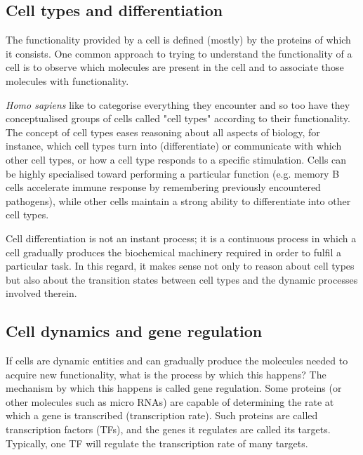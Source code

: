 \subsection{Cell types and differentiation}
The functionality provided by a cell is defined (mostly) by the proteins of which it consists. One common approach to trying to understand the functionality of a cell is to observe which molecules are present in the cell and to associate those molecules with functionality. 

\textit{Homo sapiens} like to categorise everything they encounter and so too have they conceptualised groups of cells called "cell types" according to their functionality. The concept of cell types eases reasoning about all aspects of biology, for instance, which cell types turn into (differentiate) or communicate with which other cell types, or how a cell type responds to a specific stimulation. Cells can be highly specialised toward performing a particular function (e.g. memory B cells accelerate immune response by remembering previously encountered pathogens), while other cells maintain a strong ability to differentiate into other cell types. 

Cell differentiation is not an instant process; it is a continuous process in which a cell gradually produces the biochemical machinery required in order to fulfil a particular task. In this regard, it makes sense not only to reason about cell types but also about the transition states between cell types and the dynamic processes involved therein.
\subsection{Cell dynamics and gene regulation}
If cells are dynamic entities and can gradually produce the molecules needed to acquire new functionality, what is the process by which this happens? The mechanism by which this happens is called gene regulation. Some proteins (or other molecules such as micro RNAs) are capable of determining the rate at which a gene is transcribed (transcription rate). Such proteins are called transcription factors (TFs), and the genes it regulates are called its targets. Typically, one TF will regulate the transcription rate of many targets. %

